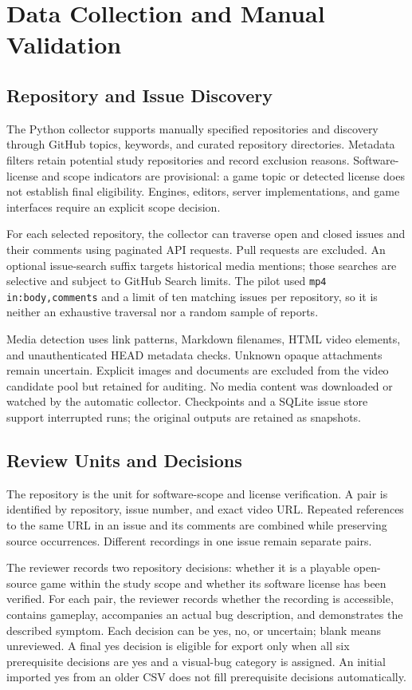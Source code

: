 \documentclass[journal,a4paper,onecolumn]{IEEEtran}
\begin{document}
\section{Data Collection and Manual Validation}
\subsection{Repository and Issue Discovery}
The Python collector supports manually specified repositories and discovery through GitHub topics, keywords, and curated repository directories. Metadata filters retain potential study repositories and record exclusion reasons. Software-license and scope indicators are provisional: a game topic or detected license does not establish final eligibility. Engines, editors, server implementations, and game interfaces require an explicit scope decision.

For each selected repository, the collector can traverse open and closed issues and their comments using paginated API requests. Pull requests are excluded. An optional issue-search suffix targets historical media mentions; those searches are selective and subject to GitHub Search limits. The pilot used \texttt{mp4 in:body,comments} and a limit of ten matching issues per repository, so it is neither an exhaustive traversal nor a random sample of reports.

Media detection uses link patterns, Markdown filenames, HTML video elements, and unauthenticated HEAD metadata checks. Unknown opaque attachments remain uncertain. Explicit images and documents are excluded from the video candidate pool but retained for auditing. No media content was downloaded or watched by the automatic collector. Checkpoints and a SQLite issue store support interrupted runs; the original outputs are retained as snapshots.

\subsection{Review Units and Decisions}
The repository is the unit for software-scope and license verification. A pair is identified by repository, issue number, and exact video URL. Repeated references to the same URL in an issue and its comments are combined while preserving source occurrences. Different recordings in one issue remain separate pairs.

The reviewer records two repository decisions: whether it is a playable open-source game within the study scope and whether its software license has been verified. For each pair, the reviewer records whether the recording is accessible, contains gameplay, accompanies an actual bug description, and demonstrates the described symptom. Each decision can be yes, no, or uncertain; blank means unreviewed. A final yes decision is eligible for export only when all six prerequisite decisions are yes and a visual-bug category is assigned. An initial imported yes from an older CSV does not fill prerequisite decisions automatically.
\end{document}
